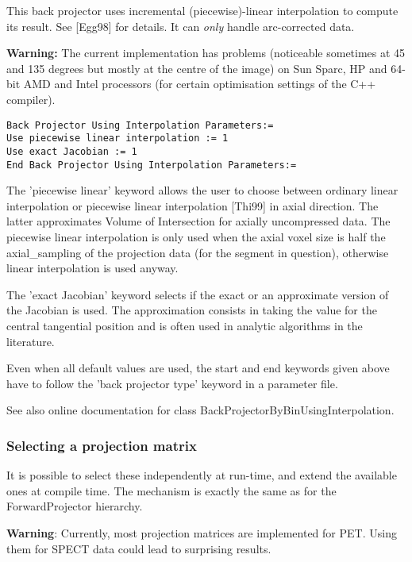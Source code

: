 \documentclass{article}
\begin{document}
{ 
}
\label{sec:IncrementalInterpolationBackProjector}
This back projector uses incremental (piecewise)-linear interpolation 
to compute its result. See [Egg98] for details. It can \textit{only} handle arc-corrected data.


\textbf{Warning:} The current implementation has problems (noticeable 
sometimes at 45 and 135 degrees but mostly at the centre of the image) on Sun 
Sparc, HP and 64-bit AMD and Intel processors (for certain optimisation settings
of the C++ compiler).

{ 
}
\begin{verbatim}
Back Projector Using Interpolation Parameters:=
Use piecewise linear interpolation := 1
Use exact Jacobian := 1
End Back Projector Using Interpolation Parameters:=
\end{verbatim}

The 'piecewise linear' keyword allows the user to choose between 
ordinary linear interpolation or piecewise linear interpolation 
[Thi99] in axial direction. The latter approximates Volume of 
Intersection for axially uncompressed data. The piecewise linear 
interpolation is only used when the axial voxel size is half 
the axial\_sampling of the projection data (for the segment in 
question), otherwise linear interpolation is used anyway.


The 'exact Jacobian' keyword selects if the exact or an approximate 
version of the Jacobian is used. The approximation consists in 
taking the value for the central tangential position and is often 
used in analytic algorithms in the literature.


Even when all default values are used, the start and end keywords 
given above have to follow the 'back projector type' keyword 
in a parameter file.


See also online documentation for class BackProjectorByBinUsingInterpolation.



\subsubsection{
Selecting a projection matrix}
\label{sec:projmatrix}
It is possible to select these independently at run-time, and 
extend the available ones at compile time. The mechanism is exactly 
the same as for the ForwardProjector hierarchy.

\textbf{Warning}: Currently, most projection matrices are implemented for PET. Using them for 
SPECT data could lead to surprising results. 
\end{document}

